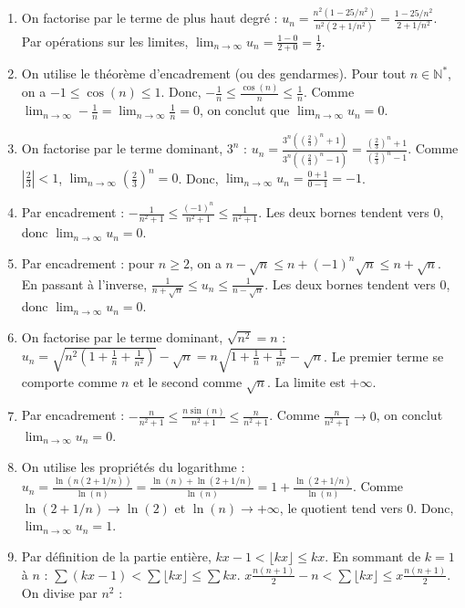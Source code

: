 \documentclass[solutions]{exercices}
\begin{document}
\begin{solution}
	\begin{enumerate}
		\item On factorise par le terme de plus haut degré : $u_n = \frac{n^2(1 - 25/n^2)}{n^2(2 + 1/n^2)} = \frac{1 - 25/n^2}{2 + 1/n^2}$. Par opérations sur les limites, $\lim_{n\to\infty} u_n = \frac{1-0}{2+0} = \frac{1}{2}$.
		\item On utilise le théorème d'encadrement (ou des gendarmes). Pour tout $n \in \mathbb{N}^*$, on a $-1 \le \cos(n) \le 1$. Donc, $-\frac{1}{n} \le \frac{\cos(n)}{n} \le \frac{1}{n}$. Comme $\lim_{n\to\infty} -\frac{1}{n} = \lim_{n\to\infty} \frac{1}{n} = 0$, on conclut que $\lim_{n\to\infty} u_n = 0$.
		\item On factorise par le terme dominant, $3^n$ : $u_n = \frac{3^n((\frac{2}{3})^n + 1)}{3^n((\frac{2}{3})^n - 1)} = \frac{(\frac{2}{3})^n + 1}{(\frac{2}{3})^n - 1}$. Comme $|\frac{2}{3}| < 1$, $\lim_{n\to\infty} (\frac{2}{3})^n = 0$. Donc, $\lim_{n\to\infty} u_n = \frac{0+1}{0-1} = -1$.
		\item Par encadrement : $-\frac{1}{n^2+1} \le \frac{(-1)^n}{n^2+1} \le \frac{1}{n^2+1}$. Les deux bornes tendent vers 0, donc $\lim_{n\to\infty} u_n = 0$.
		\item Par encadrement : pour $n \ge 2$, on a $n-\sqrt{n} \le n+(-1)^n\sqrt{n} \le n+\sqrt{n}$. En passant à l'inverse, $\frac{1}{n+\sqrt{n}} \le u_n \le \frac{1}{n-\sqrt{n}}$. Les deux bornes tendent vers 0, donc $\lim_{n\to\infty} u_n = 0$.
		\item On factorise par le terme dominant, $\sqrt{n^2}=n$ : $u_n = \sqrt{n^2(1+\frac{1}{n}+\frac{1}{n^2})} - \sqrt{n} = n\sqrt{1+\frac{1}{n}+\frac{1}{n^2}} - \sqrt{n}$. Le premier terme se comporte comme $n$ et le second comme $\sqrt{n}$. La limite est $+\infty$.
		\item Par encadrement : $-\frac{n}{n^2+1} \le \frac{n\sin(n)}{n^2+1} \le \frac{n}{n^2+1}$. Comme $\frac{n}{n^2+1} \to 0$, on conclut $\lim_{n\to\infty} u_n = 0$.
		\item On utilise les propriétés du logarithme : $u_n = \frac{\ln(n(2+1/n))}{\ln(n)} = \frac{\ln(n) + \ln(2+1/n)}{\ln(n)} = 1 + \frac{\ln(2+1/n)}{\ln(n)}$. Comme $\ln(2+1/n) \to \ln(2)$ et $\ln(n) \to +\infty$, le quotient tend vers 0. Donc, $\lim_{n\to\infty} u_n = 1$.
		\item Par définition de la partie entière, $kx-1 < \lfloor kx \rfloor \le kx$. En sommant de $k=1$ à $n$ : $\sum(kx-1) < \sum \lfloor kx \rfloor \le \sum kx$.
		      $x\frac{n(n+1)}{2} - n < \sum \lfloor kx \rfloor \le x\frac{n(n+1)}{2}$. On divise par $n^2$ :

\end{enumerate}
\end{solution}
\end{document}
